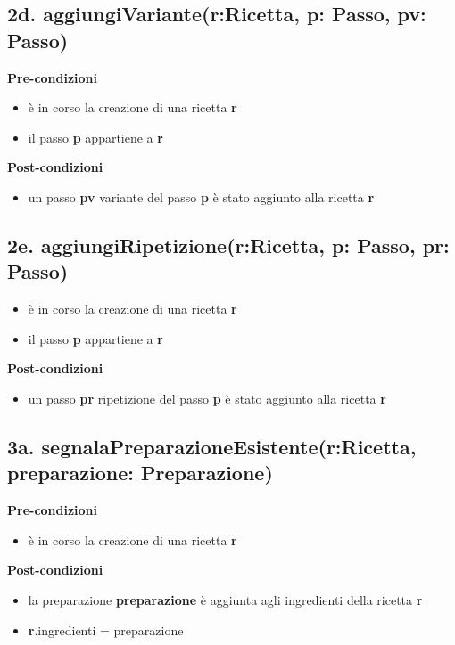 \documentclass[12pt]{extarticle}
\begin{document}
\subsection*{2d. aggiungiVariante(r:Ricetta, p: Passo, pv: Passo)}

\textbf{Pre-condizioni}
\begin{itemize}
  \item è in corso la creazione di una ricetta  \textbf{r}
  \item il passo \textbf{p} appartiene a \textbf{r}
\end{itemize}
\textbf{Post-condizioni}
\begin{itemize}
  \item un passo  \textbf{pv} variante del passo  \textbf{p} è stato aggiunto alla ricetta  \textbf{r}
\end{itemize}

\subsection*{2e. aggiungiRipetizione(r:Ricetta, p: Passo, pr: Passo)}
\begin{itemize}
  \item è in corso la creazione di una ricetta  \textbf{r}
  \item il passo \textbf{p} appartiene a \textbf{r}
\end{itemize}
\textbf{Post-condizioni}
\begin{itemize}
  \item un passo  \textbf{pr} ripetizione del passo  \textbf{p} è stato aggiunto alla ricetta  \textbf{r}
\end{itemize}

\subsection*{3a. segnalaPreparazioneEsistente(r:Ricetta, preparazione: Preparazione)}

\textbf{Pre-condizioni}
\begin{itemize}
  \item è in corso la creazione di una ricetta  \textbf{r}
\end{itemize}
\textbf{Post-condizioni}
\begin{itemize}
  \item la preparazione  \textbf{preparazione} è aggiunta agli ingredienti della ricetta  \textbf{r}
  \item \textbf{r}.ingredienti = preparazione
\end{itemize}
\end{document}
